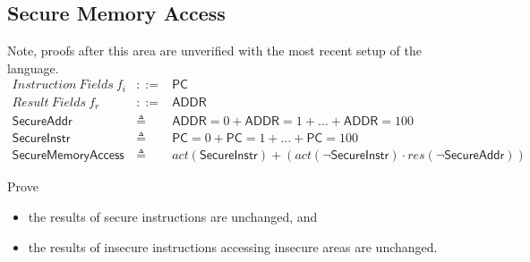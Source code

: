 \documentclass[12pt, letterpaper]{article}
\begin{document}
 


\subsection{Secure Memory Access}
Note, proofs after this area are unverified with the most recent setup of the language.
 \[
 \begin{array}{rcl}
   \mathit{Instruction\ Fields}\ f_i &::=& \mathsf{PC} \\
   \mathit{Result\ Fields}\ f_r &::=& \mathsf{ADDR} \\
   \mathsf{SecureAddr} &\triangleq& \mathsf{ADDR} = 0 + \mathsf{ADDR} = 1 + \ldots + \mathsf{ADDR} = 100 \\
   \mathsf{SecureInstr} &\triangleq& \mathsf{PC} = 0 + \mathsf{PC} = 1 + \ldots + \mathsf{PC} = 100 \\
   \mathsf{SecureMemoryAccess} &\triangleq&
     \mathit{act}(\mathsf{SecureInstr}) +
     (\mathit{act}(\neg\mathsf{SecureInstr}) \cdot
      \mathit{res}(\neg\mathsf{SecureAddr}))
      
 \end{array}
 \]

 Prove
 \begin{itemize}
     \item the results of secure instructions are unchanged, and
     \item the results of insecure instructions accessing insecure areas are unchanged.
 \end{itemize}
\end{document}
